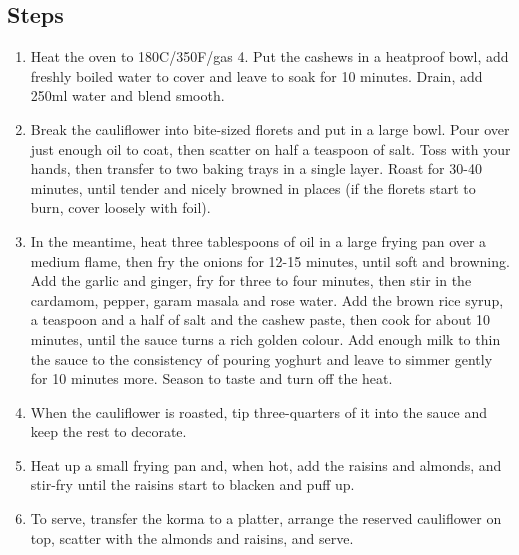 \documentclass{book}
\begin{document}
\subsection*{Steps}
\begin{enumerate}
\item Heat the oven to 180C/350F/gas 4. Put the cashews in a heatproof bowl, add freshly boiled water to cover and leave to soak for 10 minutes. Drain, add 250ml water and blend smooth.
\item Break the cauliflower into bite-sized florets and put in a large bowl. Pour over just enough oil to coat, then scatter on half a teaspoon of salt. Toss with your hands, then transfer to two baking trays in a single layer. Roast for 30-40 minutes, until tender and nicely browned in places (if the florets start to burn, cover loosely with foil).
\item In the meantime, heat three tablespoons of oil in a large frying pan over a medium flame, then fry the onions for 12-15 minutes, until soft and browning. Add the garlic and ginger, fry for three to four minutes, then stir in the cardamom, pepper, garam masala and rose water. Add the brown rice syrup, a teaspoon and a half of salt and the cashew paste, then cook for about 10 minutes, until the sauce turns a rich golden colour. Add enough milk to thin the sauce to the consistency of pouring yoghurt and leave to simmer gently for 10 minutes more. Season to taste and turn off the heat.
\item When the cauliflower is roasted, tip three-quarters of it into the sauce and keep the rest to decorate.
\item Heat up a small frying pan and, when hot, add the raisins and almonds, and stir-fry until the raisins start to blacken and puff up.
\item To serve, transfer the korma to a platter, arrange the reserved cauliflower on top, scatter with the almonds and raisins, and serve.
\end{enumerate}
\newpage
\end{document}
